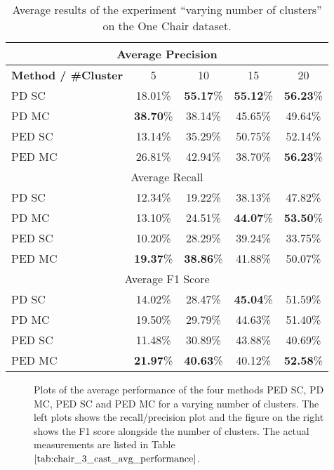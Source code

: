 \begin{table}[H]
\centering
\begin{tabular}{|l|c|c|c|c|}
\hline
\multicolumn{5}{|c|}{Average Precision} \\ \hline
\textbf{Method / \#Cluster} & 5 & 10 & 15 & 20 \\ \hline
PD SC & 18.01\% & \textbf{55.17}\% & \textbf{55.12}\% & \textbf{56.23}\% \\ \hline
PD MC & \textbf{38.70}\% & 38.14\% & 45.65\% & 49.64\% \\ \hline
PED SC & 13.14\% & 35.29\% & 50.75\% & 52.14\%  \\ \hline
PED MC & 26.81\% & 42.94\% & 38.70\% & \textbf{56.23}\% \\ \hline
\multicolumn{5}{|c|}{Average Recall} \\ \hline
PD SC & 12.34\% & 19.22\% & 38.13\% & 47.82\% \\ \hline
PD MC & 13.10\% & 24.51\% & \textbf{44.07}\% & \textbf{53.50}\% \\ \hline
PED SC & 10.20\% & 28.29\% & 39.24\% & 33.75\% \\ \hline
PED MC & \textbf{19.37}\% & \textbf{38.86}\% & 41.88\% & 50.07\% \\ \hline
\multicolumn{5}{|c|}{Average F1 Score} \\ \hline
PD SC & 14.02\% & 28.47\% & \textbf{45.04}\% & 51.59\% \\ \hline
PD MC & 19.50\% & 29.79\% & 44.63\% & 51.40\% \\ \hline
PED SC & 11.48\% & 30.89\% & 43.88\% & 40.69\% \\ \hline
PED MC & \textbf{21.97}\% & \textbf{40.63}\% & 40.12\% & \textbf{52.58}\% \\ \hline
\end{tabular}
\caption[Chair 3 Cast: Average Precision Scores]{Average results of the experiment \enquote{varying number of clusters} on the One Chair dataset.}
\label{tab:chair_3_cast_avg_performance}
\end{table}

\begin{figure}[H]
\begin{center}

\end{center}
\caption[Chair 3 Cast avg statistic plots]{Plots of the average performance of the four methods PED SC, PD MC, PED SC and PED MC for a varying number of clusters. The left plots shows the recall/precision plot and the figure on the right shows the F1 score alongside the number of clusters. The actual measurements are listed in Table $\ref{tab:chair_3_cast_avg_performance}$.}
\label{fig:chair_3_cast_plot_avg_stat}
\end{figure}

